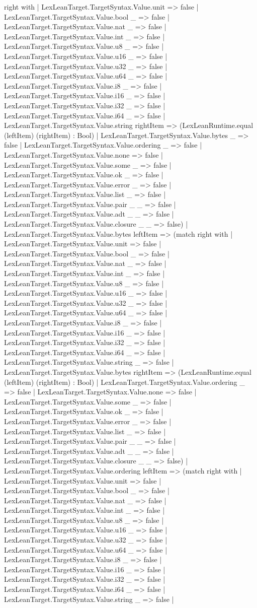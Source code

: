 \documentclass[11pt]{article}
\begin{document}
right with | LexLeanTarget.TargetSyntax.Value.unit => false | LexLeanTarget.TargetSyntax.Value.bool \_ => false | LexLeanTarget.TargetSyntax.Value.nat \_ => false | LexLeanTarget.TargetSyntax.Value.int \_ => false | LexLeanTarget.TargetSyntax.Value.u8 \_ => false | LexLeanTarget.TargetSyntax.Value.u16 \_ => false | LexLeanTarget.TargetSyntax.Value.u32 \_ => false | LexLeanTarget.TargetSyntax.Value.u64 \_ => false | LexLeanTarget.TargetSyntax.Value.i8 \_ => false | LexLeanTarget.TargetSyntax.Value.i16 \_ => false | LexLeanTarget.TargetSyntax.Value.i32 \_ => false | LexLeanTarget.TargetSyntax.Value.i64 \_ => false | LexLeanTarget.TargetSyntax.Value.string rightItem => (LexLeanRuntime.equal (leftItem) (rightItem) : Bool) | LexLeanTarget.TargetSyntax.Value.bytes \_ => false | LexLeanTarget.TargetSyntax.Value.ordering \_ => false | LexLeanTarget.TargetSyntax.Value.none => false | LexLeanTarget.TargetSyntax.Value.some \_ => false | LexLeanTarget.TargetSyntax.Value.ok \_ => false | LexLeanTarget.TargetSyntax.Value.error \_ => false | LexLeanTarget.TargetSyntax.Value.list \_ => false | LexLeanTarget.TargetSyntax.Value.pair \_ \_ => false | LexLeanTarget.TargetSyntax.Value.adt \_ \_ => false | LexLeanTarget.TargetSyntax.Value.closure \_ \_ => false) | LexLeanTarget.TargetSyntax.Value.bytes leftItem => (match right with | LexLeanTarget.TargetSyntax.Value.unit => false | LexLeanTarget.TargetSyntax.Value.bool \_ => false | LexLeanTarget.TargetSyntax.Value.nat \_ => false | LexLeanTarget.TargetSyntax.Value.int \_ => false | LexLeanTarget.TargetSyntax.Value.u8 \_ => false | LexLeanTarget.TargetSyntax.Value.u16 \_ => false | LexLeanTarget.TargetSyntax.Value.u32 \_ => false | LexLeanTarget.TargetSyntax.Value.u64 \_ => false | LexLeanTarget.TargetSyntax.Value.i8 \_ => false | LexLeanTarget.TargetSyntax.Value.i16 \_ => false | LexLeanTarget.TargetSyntax.Value.i32 \_ => false | LexLeanTarget.TargetSyntax.Value.i64 \_ => false | LexLeanTarget.TargetSyntax.Value.string \_ => false | LexLeanTarget.TargetSyntax.Value.bytes rightItem => (LexLeanRuntime.equal (leftItem) (rightItem) : Bool) | LexLeanTarget.TargetSyntax.Value.ordering \_ => false | LexLeanTarget.TargetSyntax.Value.none => false | LexLeanTarget.TargetSyntax.Value.some \_ => false | LexLeanTarget.TargetSyntax.Value.ok \_ => false | LexLeanTarget.TargetSyntax.Value.error \_ => false | LexLeanTarget.TargetSyntax.Value.list \_ => false | LexLeanTarget.TargetSyntax.Value.pair \_ \_ => false | LexLeanTarget.TargetSyntax.Value.adt \_ \_ => false | LexLeanTarget.TargetSyntax.Value.closure \_ \_ => false) | LexLeanTarget.TargetSyntax.Value.ordering leftItem => (match right with | LexLeanTarget.TargetSyntax.Value.unit => false | LexLeanTarget.TargetSyntax.Value.bool \_ => false | LexLeanTarget.TargetSyntax.Value.nat \_ => false | LexLeanTarget.TargetSyntax.Value.int \_ => false | LexLeanTarget.TargetSyntax.Value.u8 \_ => false | LexLeanTarget.TargetSyntax.Value.u16 \_ => false | LexLeanTarget.TargetSyntax.Value.u32 \_ => false | LexLeanTarget.TargetSyntax.Value.u64 \_ => false | LexLeanTarget.TargetSyntax.Value.i8 \_ => false | LexLeanTarget.TargetSyntax.Value.i16 \_ => false | LexLeanTarget.TargetSyntax.Value.i32 \_ => false | LexLeanTarget.TargetSyntax.Value.i64 \_ => false | LexLeanTarget.TargetSyntax.Value.string \_ => false | 
\end{document}
